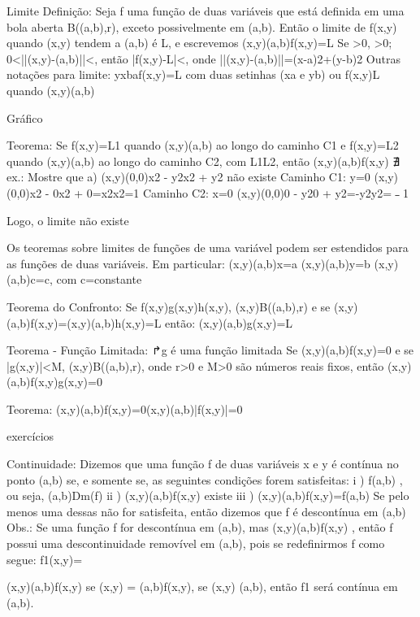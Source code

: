 {Limite
Definição:
    Seja f uma função de duas variáveis que está definida em uma bola aberta B((a,b),r), exceto possivelmente em (a,b). Então o limite de f(x,y) quando (x,y) tendem a (a,b) é L, e escrevemos 
            (x,y)(a,b)f(x,y)=L
    Se >0, >0; 0<||(x,y)-(a,b)||<, então |f(x,y)-L|<, 
    onde ||(x,y)-(a,b)||=(x-a)2+(y-b)2
    Outras notações para limite:
        yxbaf(x,y)=L com duas setinhas (xa e yb)
      ou
        f(x,y)L quando (x,y)(a,b)


            Gráfico



Teorema:
    Se f(x,y)=L1 quando (x,y)(a,b) ao longo do caminho C1 e f(x,y)=L2 quando (x,y)(a,b) ao longo do caminho C2, com L1L2, então (x,y)(a,b)f(x,y) ∄ 
    ex.: Mostre que
        a) (x,y)(0,0)x2 - y2x2 + y2 não existe
            Caminho C1: y=0
                (x,y)(0,0)x2 - 0x2 + 0=x2x2=1
            Caminho C2: x=0
                (x,y)(0,0)0 - y20 + y2=-y2y2=﹣1

            Logo, o limite não existe
    







Os teoremas sobre limites de funções de uma variável podem ser estendidos para as funções de duas variáveis. Em particular:
    (x,y)(a,b)x=a
    (x,y)(a,b)y=b
    (x,y)(a,b)c=c, com c=constante

Teorema do Confronto:
    Se f(x,y)g(x,y)h(x,y), (x,y)B((a,b),r) e se 
            (x,y)(a,b)f(x,y)=(x,y)(a,b)h(x,y)=L
    então:
            (x,y)(a,b)g(x,y)=L

Teorema - Função Limitada:             ↱g é uma função limitada
    Se (x,y)(a,b)f(x,y)=0 e se |g(x,y)|<M, (x,y)B((a,b),r), onde r>0 e M>0 são números reais fixos, então
            (x,y)(a,b)f(x,y)g(x,y)=0

Teorema:
    (x,y)(a,b)f(x,y)=0(x,y)(a,b)|f(x,y)|=0  

   exercícios

Continuidade:
    Dizemos que uma função f de duas variáveis x e y é contínua no ponto (a,b) se, e somente se, as seguintes condições forem satisfeitas:
        i ) f(a,b) , ou seja, (a,b)Dm(f)
        ii ) (x,y)(a,b)f(x,y) existe
        iii ) (x,y)(a,b)f(x,y)=f(a,b)
    Se pelo menos uma dessas não for satisfeita, então dizemos que f é descontínua em (a,b)
    Obs.: Se uma função f for descontínua em (a,b), mas (x,y)(a,b)f(x,y) , então f possui uma 
              descontinuidade removível em (a,b), pois se redefinirmos f como segue:
              f1(x,y)={ (x,y)(a,b)f(x,y) se (x,y) = (a,b)f(x,y), se (x,y)  (a,b), então f1 será contínua em (a,b). 

}}
